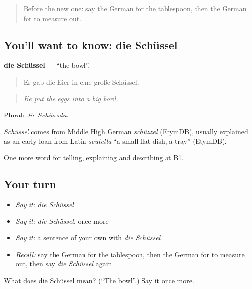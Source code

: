 \label{lesson:GE-C322-schuessel}



\begin{quote}
Before the new one: say the German for the tablespoon, then the German for to measure out.
\end{quote}

\subsection*{You'll want to know: die Schüssel}
\textbf{die Schüssel} — \textquotedblleft{}the bowl\textquotedblright{}.

\begin{quote}
Er gab die Eier in eine große Schüssel.
\end{quote}

\begin{quote}
\emph{He put the eggs into a big bowl.}
\end{quote}

Plural: \emph{die Schüsseln}.

\begin{cousinweb}
\emph{Schüssel} comes from Middle High German \emph{schüzzel} (EtymDB), usually explained as an early loan from Latin \emph{scutella} \textquotedblleft{}a small flat dish, a tray\textquotedblright{} (EtymDB).
\end{cousinweb}

\begin{grammarlens}[title={What you've built}]
One more word for telling, explaining and describing at B1.
\end{grammarlens}

\subsection*{Your turn}
\begin{itemize}
\raggedright
  \item \emph{Say it:} \emph{die Schüssel}
  \item \emph{Say it:} \emph{die Schüssel}, once more
  \item \emph{Say it:} a sentence of your own with \emph{die Schüssel}
  \item \emph{Recall:} say the German for the tablespoon, then the German for to measure out, then say \emph{die Schüssel} again
\end{itemize}

\begin{tcolorbox}[breakable,colback=teal!4,colframe=teal!35!black,title={Before you move on}]
What does die Schüssel mean? (\textquotedblleft{}The bowl\textquotedblright{}.) Say it once more.
\end{tcolorbox}
